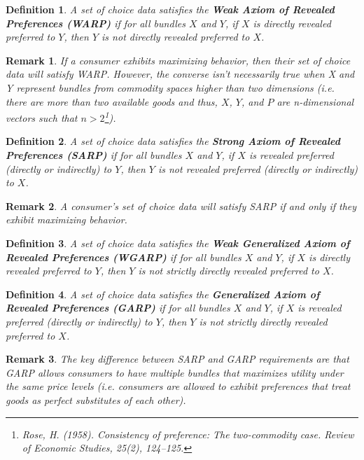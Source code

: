 \documentclass{article} %
\newtheorem{definition}{Definition} %
\newtheorem{remark}{Remark}
\begin{document}
\begin{definition}
A set of choice data satisfies the \textbf{Weak Axiom of Revealed Preferences (WARP)} if for all bundles $X$ and $Y$, if $X$ is directly revealed preferred to $Y$, then $Y$ is not directly revealed preferred to $X$.
\end{definition}

\begin{remark}
If a consumer exhibits maximizing behavior, then their set of choice data will satisfy WARP. However, the converse isn't necessarily true when X and Y represent bundles from commodity spaces higher than two dimensions (i.e. there are more than two available goods and thus, $X$, $Y$, and $P$ are n-dimensional vectors such that $n> 2$\footnote{Rose, H. (1958). Consistency of preference: The two-commodity case. Review of Economic Studies, 25(2), 124–125. }). 
\end{remark}

\begin{definition}
A set of choice data satisfies the \textbf{Strong Axiom of Revealed Preferences (SARP)} if for all bundles $X$ and $Y$, if $X$ is revealed preferred (directly or indirectly) to $Y$, then $Y$ is not revealed preferred (directly or indirectly) to $X$.
\end{definition}

\begin{remark}
A consumer's set of choice data will satisfy SARP if and only if they exhibit maximizing behavior. 
\end{remark}

\begin{definition}
A set of choice data satisfies the \textbf{Weak Generalized Axiom of Revealed Preferences (WGARP)} if for all bundles $X$ and $Y$, if $X$ is directly revealed preferred to $Y$, then $Y$ is not strictly directly revealed preferred to $X$.
\end{definition}

\begin{definition}
A set of choice data satisfies the \textbf{Generalized Axiom of Revealed Preferences (GARP)} if for all bundles $X$ and $Y$, if $X$ is revealed preferred (directly or indirectly) to $Y$, then $Y$ is not strictly directly revealed preferred to $X$.
\end{definition}

\begin{remark}
The key difference between SARP and GARP requirements are that GARP allows consumers to have multiple bundles that maximizes utility under the same price levels (i.e. consumers are allowed to exhibit preferences that treat goods as perfect substitutes of each other).
\end{remark}
\end{document}
